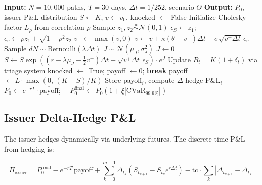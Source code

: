 \documentclass[12pt]{article}
\begin{document}
\begin{algorithm}[H]
\caption{CSU Monte Carlo Pricing with Dynamic Barrier and Full Truncation}
\label{alg:mc}
\begin{algorithmic}
\STATE \textbf{Input:} $N=10{,}000$ paths, $T=30$ days, $\Delta t = 1/252$, scenario $\Theta$
\STATE \textbf{Output:} $P_0$, issuer P\&L distribution
    \STATE $S \leftarrow K$, $v \leftarrow v_0$, knocked $\leftarrow$ False
    \STATE Initialize Cholesky factor $L_\rho$ from correlation $\rho$
        \STATE Sample $z_1, z_2 \overset{\text{iid}}{\sim} \mathcal{N}(0,1)$
        \STATE $\epsilon_S \leftarrow z_1$; $\epsilon_v \leftarrow \rho z_1 + \sqrt{1-\rho^2} z_2$
        \STATE $v^+ \leftarrow \max(v, 0)$ 
        \STATE $v \leftarrow v + \kappa(\theta - v^+)\Delta t + \sigma\sqrt{v^+ \Delta t}\,\epsilon_v$
        \STATE Sample $dN \sim \text{Bernoulli}(\lambda \Delta t)$
            \STATE $J \sim \mathcal{N}(\mu_J, \sigma_J^2)$
        \ELSE
            \STATE $J \leftarrow 0$
        \ENDIF
        \STATE $S \leftarrow S \exp\!\left((r - \lambda\bar{\mu}_J - \tfrac{1}{2}v^+)\Delta t
               + \sqrt{v^+\Delta t}\,\epsilon_S\right) \cdot e^J$
        \STATE Update $B_t = K(1 + \delta_t)$ via triage system
            \STATE knocked $\leftarrow$ True; payoff $\leftarrow 0$; \textbf{break}
        \ENDIF
    \ENDFOR
        \STATE payoff $\leftarrow L \cdot \max(0,\, (K-S)/K)$
    \ENDIF
    \STATE Store payoff$_i$, compute $\Delta$-hedge P\&L$_i$
\ENDFOR
\STATE $P_0 \leftarrow e^{-rT} \cdot \overline{\text{payoff}}$;
       $\quad P_0^{\text{final}} \leftarrow P_0(1 + \xi|\text{CVaR}_{99.9\%}|)$
\end{algorithmic}
\end{algorithm}

\subsection{Issuer Delta-Hedge P\&L}

The issuer hedges dynamically via underlying futures. The discrete-time P\&L from hedging is:

\begin{equation}
    \Pi_{\text{issuer}} = P_0^{\text{final}} - e^{-rT}\,\text{payoff}
    + \sum_{k=0}^{m-1} \Delta_{t_k}\left(S_{t_{k+1}} - S_{t_k} e^{r\Delta t}\right)
    - \text{tc} \cdot \sum_{k} |\Delta_{t_{k+1}} - \Delta_{t_k}|
    \label{eq:pnl}
\end{equation}
\end{document}
